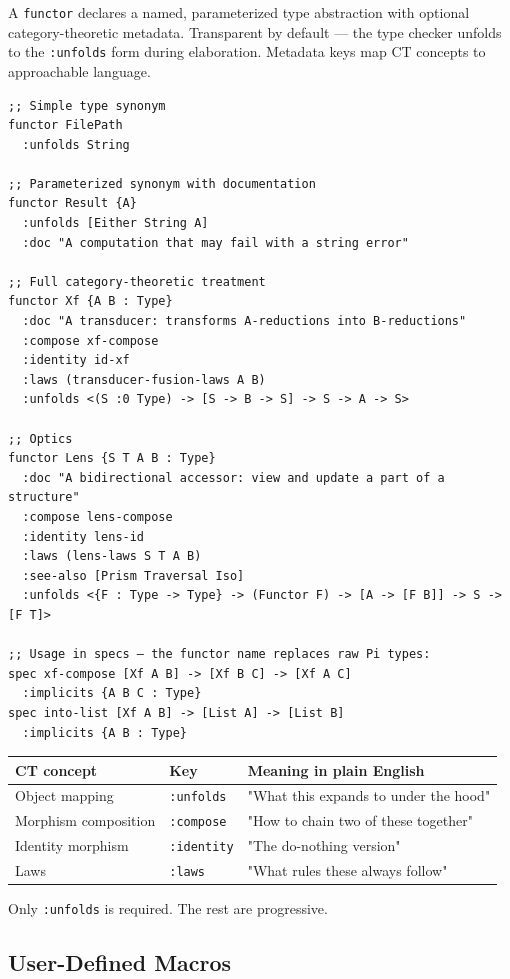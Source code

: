 \documentclass[11pt]{article}
\begin{document}
A \texttt{functor} declares a named, parameterized type abstraction with optional
category-theoretic metadata. Transparent by default --- the type checker unfolds
to the \texttt{:unfolds} form during elaboration. Metadata keys map CT concepts to
approachable language.

\begin{verbatim}
;; Simple type synonym
functor FilePath
  :unfolds String

;; Parameterized synonym with documentation
functor Result {A}
  :unfolds [Either String A]
  :doc "A computation that may fail with a string error"

;; Full category-theoretic treatment
functor Xf {A B : Type}
  :doc "A transducer: transforms A-reductions into B-reductions"
  :compose xf-compose
  :identity id-xf
  :laws (transducer-fusion-laws A B)
  :unfolds <(S :0 Type) -> [S -> B -> S] -> S -> A -> S>

;; Optics
functor Lens {S T A B : Type}
  :doc "A bidirectional accessor: view and update a part of a structure"
  :compose lens-compose
  :identity lens-id
  :laws (lens-laws S T A B)
  :see-also [Prism Traversal Iso]
  :unfolds <{F : Type -> Type} -> (Functor F) -> [A -> [F B]] -> S -> [F T]>

;; Usage in specs — the functor name replaces raw Pi types:
spec xf-compose [Xf A B] -> [Xf B C] -> [Xf A C]
  :implicits {A B C : Type}
spec into-list [Xf A B] -> [List A] -> [List B]
  :implicits {A B : Type}
\end{verbatim}

\begin{center}
\begin{tabular}{lll}
CT concept & Key & Meaning in plain English\\
\hline
Object mapping & \texttt{:unfolds} & "What this expands to under the hood"\\
Morphism composition & \texttt{:compose} & "How to chain two of these together"\\
Identity morphism & \texttt{:identity} & "The do-nothing version"\\
Laws & \texttt{:laws} & "What rules these always follow"\\
\end{tabular}
\end{center}

Only \texttt{:unfolds} is required. The rest are progressive.
\subsection{User-Defined Macros}
\label{sec:orgc1f4c3a}
\end{document}
